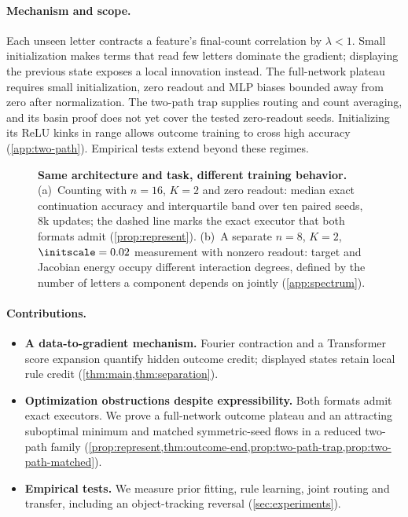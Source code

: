 \paragraph{Mechanism and scope.}
Each unseen letter contracts a feature's final-count correlation by $\lambda<1$.
Small initialization makes terms that read few letters dominate the gradient;
displaying the previous state exposes a local innovation instead.
The full-network plateau requires small initialization, zero readout and MLP
biases bounded away from zero after normalization. The two-path trap supplies
routing and count averaging, and its basin proof does not yet cover the tested
zero-readout seeds. Initializing its ReLU kinks in range allows outcome training
to cross high accuracy (\cref{app:two-path}). Empirical tests extend beyond these regimes.

\begin{figure}[t]
\centering

\caption{\textbf{Same architecture and task, different training behavior.}
(a)~Counting with $n=16$, $K=2$ and zero readout: median exact continuation accuracy and interquartile band over ten paired seeds, $8$k
updates; the dashed line marks the exact executor that both formats admit (\cref{prop:represent}).
(b)~A separate $n=8$, $K=2$, $\initscale=0.02$ measurement with nonzero readout: target and Jacobian energy occupy different interaction degrees, defined by the number of letters a component depends on jointly (\cref{app:spectrum}).}
\label{fig:overview}
\end{figure}

\paragraph{Contributions.}
\begin{itemize}[leftmargin=*,itemsep=3pt,topsep=3pt]
\item \textbf{A data-to-gradient mechanism.} Fourier contraction and a Transformer
score expansion quantify hidden outcome credit; displayed states retain local rule
credit (\cref{thm:main,thm:separation}).
\item \textbf{Optimization obstructions despite expressibility.} Both formats admit
exact executors. We prove a full-network outcome plateau and an attracting
suboptimal minimum and matched symmetric-seed flows in a reduced two-path family
(\cref{prop:represent,thm:outcome-end,prop:two-path-trap,prop:two-path-matched}).
\item \textbf{Empirical tests.} We measure prior fitting, rule learning, joint routing
and transfer, including an object-tracking reversal (\cref{sec:experiments}).
\end{itemize}

